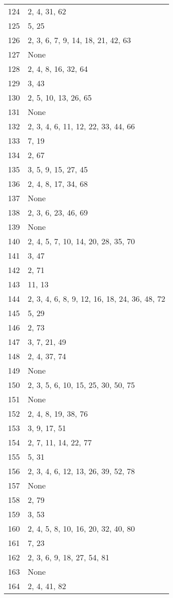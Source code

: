 \documentclass[12pt]{article}
\begin{document}
\begin{tabular}{|r|l|}
124 & 2, 4, 31, 62 \\ 
125 & 5, 25 \\ 
126 & 2, 3, 6,  7, 9, 14, 18, 21, 42, 63 \\ 
127 & None \\ 
128 & 2, 4, 8, 16, 32, 64 \\ 
129 & 3, 43 \\ 
130 & 2, 5, 10, 13, 26, 65 \\ 
131 & None \\ 
132 & 2, 3, 4, 6,  11, 12, 22, 33, 44, 66 \\ 
133 & 7, 19 \\ 
134 & 2, 67 \\ 
135 & 3, 5, 9, 15, 27, 45 \\ 
136 & 2, 4, 8, 17, 34, 68 \\ 
137 & None \\ 
138 & 2, 3,  6, 23, 46, 69 \\ 
139 & None \\ 
140 & 2, 4, 5, 7, 10, 14, 20, 28, 35, 70 \\ 
141 & 3, 47 \\ 
142 & 2, 71 \\ 
143 & 11, 13 \\ 
144 & 2, 3, 4, 6, 8, 9, 12, 16, 18, 24, 36, 48, 72 \\ 
145 & 5, 29 \\ 
146 & 2, 73 \\ 
147 & 3, 7, 21, 49 \\ 
148 & 2, 4, 37, 74 \\ 
149 & None \\ 
150 & 2, 3, 5, 6, 10, 15, 25, 30, 50, 75 \\ 
151 & None \\ 
152 & 2, 4, 8,  19, 38, 76 \\ 
153 & 3, 9, 17, 51 \\ 
154 & 2, 7, 11, 14, 22, 77 \\ 
155 & 5, 31 \\ 
156 & 2, 3, 4, 6, 12, 13, 26, 39, 52, 78 \\ 
157 & None \\ 
158 & 2, 79 \\ 
159 & 3, 53 \\ 
160 & 2, 4, 5, 8, 10, 16, 20, 32, 40, 80 \\ 
161 & 7, 23 \\ 
162 & 2, 3, 6, 9, 18, 27, 54,  81 \\ 
163 & None \\ 
164 & 2, 4, 41, 82 \\ 

\end{tabular}
\end{document}
